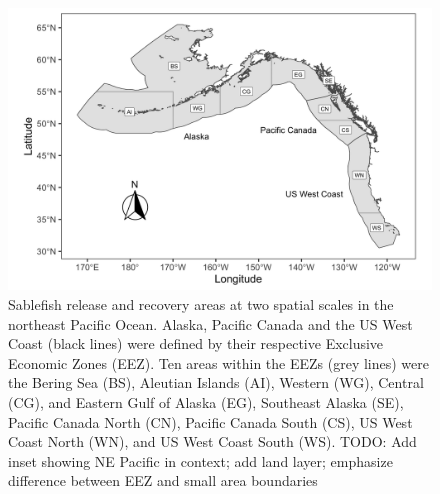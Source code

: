 \documentclass{article}
\newcommand{\lr}[1]{{\color{blue}#1}}
\begin{document}
\begin{figure}[htb]
    \centering
    \includegraphics[width = \textwidth]{map-regions-areas}
    \caption{Sablefish release and recovery areas at two spatial scales in the northeast Pacific Ocean. Alaska, Pacific Canada and the US West Coast (black lines) were defined by their respective Exclusive Economic Zones (EEZ). Ten areas within the EEZs (grey lines) were the Bering Sea (BS), Aleutian Islands (AI), Western (WG), Central (CG), and Eastern Gulf of Alaska (EG), Southeast Alaska (SE), Pacific Canada North (CN), Pacific Canada South (CS), US West Coast North (WN), and US West Coast South (WS). \lr{TODO: Add inset showing NE Pacific in context; add land layer; emphasize difference between EEZ and small area boundaries}}
    \label{fig:map-regions-areas}
\end{figure}
\end{document}
